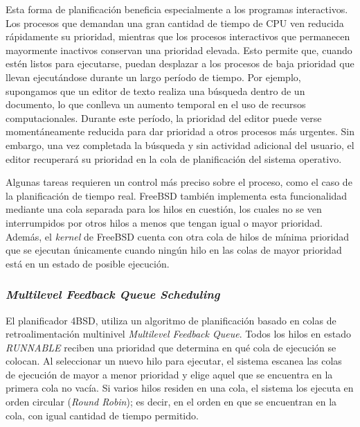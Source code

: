 Esta forma de planificación beneficia especialmente a los programas interactivos. Los procesos que demandan una gran cantidad de tiempo de CPU ven reducida rápidamente su prioridad, mientras que los procesos interactivos que permanecen mayormente inactivos conservan una prioridad elevada. Esto permite que, cuando estén listos para ejecutarse, puedan desplazar a los procesos de baja prioridad que llevan ejecutándose durante un largo período de tiempo. Por ejemplo, supongamos que un editor de texto realiza una búsqueda dentro de un documento, lo que conlleva un aumento temporal en el uso de recursos computacionales. Durante este período, la prioridad del editor puede verse momentáneamente reducida para dar prioridad a otros procesos más urgentes. Sin embargo, una vez completada la búsqueda y sin actividad adicional del usuario, el editor recuperará su prioridad en la cola de planificación del sistema operativo.\par

Algunas tareas requieren un control más preciso sobre el proceso, como el caso de la planificación de tiempo real. FreeBSD también implementa esta funcionalidad mediante una cola separada para los hilos en cuestión, los cuales no se ven interrumpidos por otros hilos a menos que tengan igual o mayor prioridad. Además, el \textit{kernel} de FreeBSD cuenta con otra cola de hilos de mínima prioridad que se ejecutan únicamente cuando ningún hilo en las colas de mayor prioridad está en un estado de posible ejecución.\par

\subsubsection{\textit{Multilevel Feedback Queue Scheduling}}

El planificador 4BSD, utiliza un algoritmo de planificación basado en colas de retroalimentación multinivel \textit{Multilevel Feedback Queue}. Todos los hilos en estado \textit{RUNNABLE} reciben una prioridad que determina en qué cola de ejecución se colocan. Al seleccionar un nuevo hilo para ejecutar, el sistema escanea las colas de ejecución de mayor a menor prioridad y elige aquel que se encuentra en la primera cola no vacía. Si varios hilos residen en una cola, el sistema los ejecuta en orden circular (\textit{Round Robin}); es decir, en el orden en que se encuentran en la cola, con igual cantidad de tiempo permitido.\par

